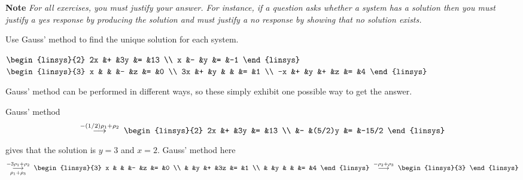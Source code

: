 \medskip
\noindent\textbf{Note}\hspace*{.2em}
\textit{For all exercises,
you must justify your answer.
For instance, if a question asks whether a system has a solution then you
must justify a yes response by producing the solution and must justify 
a no response by showing that no solution exists.}
\begin{exercises}
  \recommended \item 
    Use Gauss' method to find the unique solution for each system.
    \begin{exparts*}
      \partsitem 
        $\begin{linsys}{2}
          2x  &+  &3y  &=  &13  \\
          x   &-  &y   &=  &-1
        \end{linsys}$
      \partsitem 
        $\begin{linsys}{3}
          x   &  &  &-  &z  &=  &0  \\
          3x  &+ &y &   &   &=  &1  \\
          -x  &+ &y &+  &z  &=  &4
        \end{linsys}$
    \end{exparts*}
    \begin{answer}
      Gauss' method can be performed in different ways, so these simply 
      exhibit one possible way to get the answer.
      \begin{exparts}
        \partsitem Gauss' method
          \begin{equation*}
            \grstep{-(1/2)\rho_1+\rho_2}\;
            \begin{linsys}{2}
               2x  &+  &3y      &=  &13  \\
                   &-  &(5/2)y  &=  &-15/2              
            \end{linsys}
          \end{equation*}
          gives that the solution is $y=3$ and $x=2$.
        \partsitem Gauss' method here
          \begin{equation*}
            \grstep[\rho_1+\rho_3]{-3\rho_1+\rho_2}\;
            \begin{linsys}{3}
              x   &  &  &-  &z  &=  &0  \\
                  &  &y &+  &3z &=  &1  \\
                  &  &y &   &   &=  &4
            \end{linsys}
            \;\grstep{-\rho_2+\rho_3}\;
            \begin{linsys}{3}

\end{linsys}
\end{equation*}
\end{exparts}
\end{answer}
\end{exercises}
